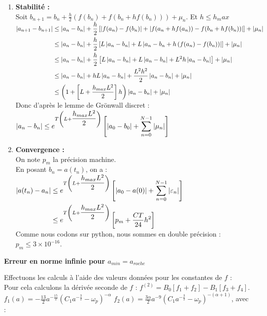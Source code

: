 \documentclass[12pt,a4paper]{article}
\begin{document}
\begin{enumerate}
		\item \textbf{Stabilité :}\\
		Soit $b_{n+1} = b_n + \frac h2 \left(f(b_n) + f(b_n + hf(b_n))\right) + \mu_n$. Et $h \leq h_max$\\
		$\begin{aligned}
			\left\lvert a_{n+1}-b_{n+1} \right\rvert &\leq  \left\lvert a_n-b_n \right\rvert + \frac h2\left[\left\lvert f(a_n)-f(b_n) \right\rvert + \left\lvert f(a_n+hf(a_n))-f(b_n+hf(b_n)) \right\rvert\right] + \left\lvert \mu_n \right\rvert\\
			&\leq \left\lvert a_n-b_n \right\rvert + \frac h2\left[L\left\lvert a_n-b_n \right\rvert + L\left\lvert a_n-b_n + h\left(f(a_n)-f(b_n)\right) \right\rvert\right] + \left\lvert \mu_n \right\rvert\\
			&\leq \left\lvert a_n-b_n \right\rvert + \frac h2\left[L\left\lvert a_n-b_n \right\rvert + L\left\lvert a_n-b_n \right\rvert + L^2h\left\lvert a_n-b_n \right\rvert\right] + \left\lvert \mu_n \right\rvert\\
			&\leq \left\lvert a_n-b_n \right\rvert + hL\left\lvert a_n-b_n \right\rvert + \frac{L^2h^2}2\left\lvert a_n-b_n \right\rvert + \left\lvert \mu_n \right\rvert\\
			&\leq \left(1+ \left[L+\frac{h_{max}L^2}2\right]h\right)\left\lvert a_n-b_n \right\rvert + \left\lvert \mu_n \right\rvert
		\end{aligned}$\\
		
		Donc d'après le lemme de Grönwall discret : $\left\lvert a_n-b_n \right\rvert \leq e^{T\left(L+\dfrac{h_{max}L^2}2\right)}\left[\left\lvert a_0-b_0 \right\rvert+\displaystyle\sum_{n=0}^{N-1} \left\lvert \mu_n \right\rvert\right]$
		
		\item \textbf{Convergence :}\\
		On note $p_m$ la précision machine.\\
		En posant $b_n = a(t_n)$, on a : $\begin{aligned}[t]
			\left\lvert a(t_n)-a_n \right\rvert &\leq e^{T\left(L+\dfrac{h_{max}L^2}2\right)}\left[\left\lvert a_0-a(0) \right\rvert+\displaystyle\sum_{n=0}^{N-1} \left\lvert \varepsilon_n \right\rvert\right]\\
			&\leq e^{T\left(L+\dfrac{h_{max}L^2}2\right)}\left[p_m+\dfrac{CT}{24}h^2\right]
		\end{aligned}$\\
		
		Comme nous codons sur python, nous sommes en double précision : $p_m \leq 3\times 10^{-16}$.
	\end{enumerate}
	
	\textbf{Erreur en norme infinie pour $a_{min} = a_{roche}$}
	
	Effectuons les calculs à l'aide des valeurs données pour les constantes de $f$ :\\
	Pour cela calculons la dérivée seconde de $f$ : $f^{(2)} = B_0\left[f_1+f_2\right] - B_1\left[f_3+f_4\right]$.\\
	$f_1(a) = -\frac{13}2a^{-\frac{15}2}\left(C_1a^{-\frac32}- \omega_p\right)^{-\alpha}$ \hspace{2cm} $f_2(a) = \frac{3\alpha}2 a^{-9}\left(C_1a^{-\frac32}-\omega_p\right)^{-(\alpha+1)}$, avec :\\
	
\end{document}
